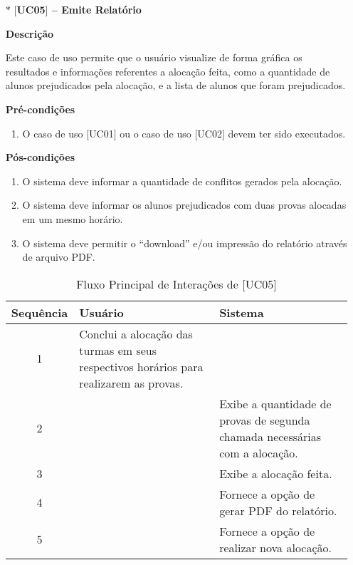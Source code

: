 \begin{itemize}
\begin{itemize}
        \item[$\ast$] \textbf{$[$UC05$]$ -- Emite Relatório}
        
        \textbf{Descrição}
        
        Este caso de uso permite que o usuário visualize de forma gráfica os resultados e informações referentes a alocação feita, como a quantidade de alunos prejudicados pela alocação, e a lista de alunos que foram prejudicados.
        
        \textbf{Pré-condições}
        \begin{enumerate}
            \item  O caso de uso $[$UC01$]$ ou o caso de uso $[$UC02$]$ devem ter sido executados.
        \end{enumerate}
        
        \textbf{Pós-condições}
        \begin{enumerate}
            \item O sistema deve informar a quantidade de conflitos gerados pela alocação.
            \item O sistema deve informar os alunos prejudicados com duas provas alocadas em um mesmo horário.
            \item O sistema deve permitir o “download” e/ou impressão do relatório através de arquivo PDF.
        \end{enumerate}
        
       \begin{table}[H]
            \centering
            \caption{Fluxo Principal de Interações de $[$UC05$]$}
            \vspace{0.5cm}
            \renewcommand\arraystretch{1.5}
            \begin{tabular}{c|p{6cm}|p{6cm}}
             
                \textbf{Sequência} & \textbf{Usuário} & \textbf{Sistema} \\ %
                \hline                               %
                1 & Conclui a alocação das turmas em seus respectivos horários para realizarem as provas.  &  \\
                2 &   & Exibe a quantidade de provas de segunda chamada necessárias com a alocação.       \\
                3 & & Exibe a alocação feita.     \\
                4 & & Fornece a opção de gerar PDF do relatório. \\ 
                5 & & Fornece a opção de realizar nova alocação. %
                \\
                \hline
            \end{tabular}
        \end{table}
        
    \end{itemize}
    
\end{itemize}





